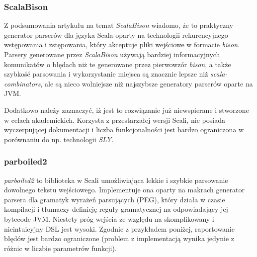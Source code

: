 \subsubsection{ScalaBison}
\label{subsubsec:scala-bison}

Z podsumowania artykułu na temat \textit{ScalaBison}\cite{boyland2010tool} wiadomo, że to praktyczny generator parserów dla języka Scala oparty na technologii rekurencyjnego wstępowania i zstępowania, który akceptuje pliki wejściowe w formacie \textit{bison}.
Parsery generowane przez \textit{ScalaBison} używają bardziej informacyjnych komunikatów o błędach niż te generowane przez pierwowzór \textit{bison}, a także szybkość parsowania i wykorzystanie miejsca są znacznie lepsze niż \textit{scala-combinators}, ale są nieco wolniejsze niż najszybsze generatory parserów oparte na JVM.

Dodatkowo należy zaznaczyć, iż jest to rozwiązanie już niewspierane i stworzone w celach akademickich.
Korzysta z przestarzałej wersji Scali, nie posiada wyczerpującej dokumentacji i liczba funkcjonalności jest bardzo ograniczona w porównaniu do np. technologii \textit{SLY}.

\subsubsection{parboiled2}
\label{subsubsec:parboiled-2}

\textit{parboiled2}\cite{myltsev2019parboiled2} to biblioteka w Scali umożliwiająca lekkie i szybkie parsowanie dowolnego tekstu wejściowego.
Implementuje ona oparty na makrach generator parsera dla gramatyk wyrażeń parsujących (PEG), który działa w czasie kompilacji i tłumaczy definicję reguły gramatycznej na odpowiadający jej bytecode JVM. Niestety próg wejścia ze względu na skomplikowany i nieintuicyjny DSL jest wysoki.
Zgodnie z przykładem poniżej, raportowanie błędów jest bardzo ograniczone (problem z implementacją wynika jedynie z różnic w liczbie parametrów funkcji).

